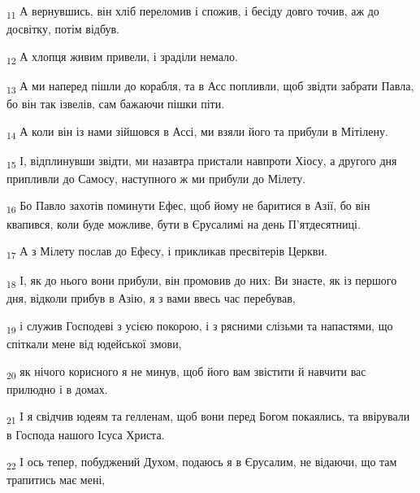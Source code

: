 \begin{tcolorbox}
\textsubscript{11} А вернувшись, він хліб переломив і спожив, і бесіду довго точив, аж до досвітку, потім відбув.
\end{tcolorbox}
\begin{tcolorbox}
\textsubscript{12} А хлопця живим привели, і зраділи немало.
\end{tcolorbox}
\begin{tcolorbox}
\textsubscript{13} А ми наперед пішли до корабля, та в Асс попливли, щоб звідти забрати Павла, бо він так ізвелів, сам бажаючи пішки піти.
\end{tcolorbox}
\begin{tcolorbox}
\textsubscript{14} А коли він із нами зійшовся в Ассі, ми взяли його та прибули в Мітілену.
\end{tcolorbox}
\begin{tcolorbox}
\textsubscript{15} І, відплинувши звідти, ми назавтра пристали навпроти Хіосу, а другого дня припливли до Самосу, наступного ж ми прибули до Мілету.
\end{tcolorbox}
\begin{tcolorbox}
\textsubscript{16} Бо Павло захотів поминути Ефес, щоб йому не баритися в Азії, бо він квапився, коли буде можливе, бути в Єрусалимі на день П'ятдесятниці.
\end{tcolorbox}
\begin{tcolorbox}
\textsubscript{17} А з Мілету послав до Ефесу, і прикликав пресвітерів Церкви.
\end{tcolorbox}
\begin{tcolorbox}
\textsubscript{18} І, як до нього вони прибули, він промовив до них: Ви знаєте, як із першого дня, відколи прибув в Азію, я з вами ввесь час перебував,
\end{tcolorbox}
\begin{tcolorbox}
\textsubscript{19} і служив Господеві з усією покорою, і з рясними слізьми та напастями, що спіткали мене від юдейської змови,
\end{tcolorbox}
\begin{tcolorbox}
\textsubscript{20} як нічого корисного я не минув, щоб його вам звістити й навчити вас прилюдно і в домах.
\end{tcolorbox}
\begin{tcolorbox}
\textsubscript{21} І я свідчив юдеям та гелленам, щоб вони перед Богом покаялись, та ввірували в Господа нашого Ісуса Христа.
\end{tcolorbox}
\begin{tcolorbox}
\textsubscript{22} І ось тепер, побуджений Духом, подаюсь я в Єрусалим, не відаючи, що там трапитись має мені,
\end{tcolorbox}
